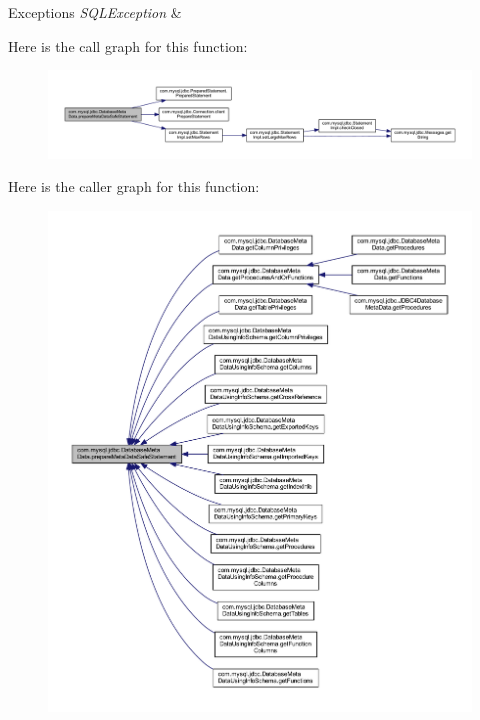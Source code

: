 \begin{DoxyExceptions}{Exceptions}
{\em S\+Q\+L\+Exception} & \\
\hline
\end{DoxyExceptions}
Here is the call graph for this function\+:
\nopagebreak
\begin{figure}[H]
\begin{center}
\leavevmode
\includegraphics[width=350pt]{classcom_1_1mysql_1_1jdbc_1_1_database_meta_data_a7e055f9029b2da1d3a7d014bca117da4_cgraph}
\end{center}
\end{figure}
Here is the caller graph for this function\+:
\nopagebreak
\begin{figure}[H]
\begin{center}
\leavevmode
\includegraphics[width=350pt]{classcom_1_1mysql_1_1jdbc_1_1_database_meta_data_a7e055f9029b2da1d3a7d014bca117da4_icgraph}
\end{center}
\end{figure}
\mbox{\label{classcom_1_1mysql_1_1jdbc_1_1_database_meta_data_acb5737394e592106fb3bc229341836e7}} 
